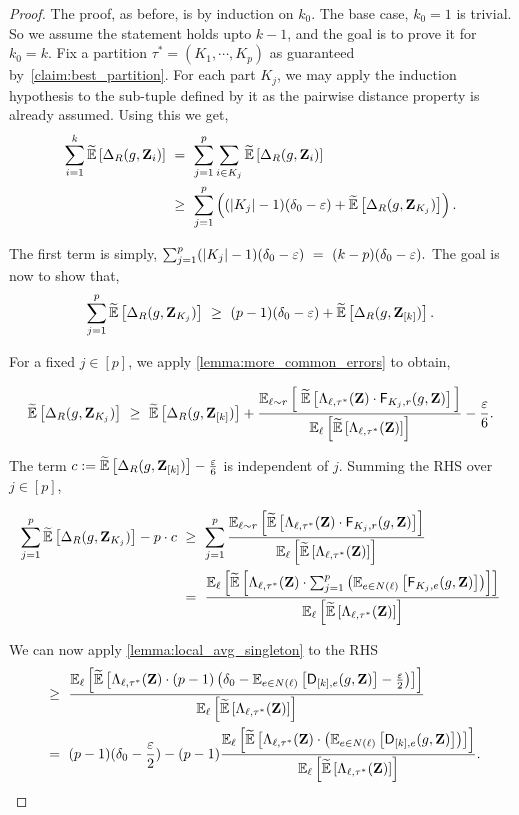 \begin{proof}
The proof, as before, is by induction on $k_0$. The base case, $k_0 =1$ is trivial. So we assume the statement holds upto $k-1$, and the goal is to prove it for $k_0=k$. Fix a partition $\tau^* = (K_1,\cdots, K_p)$ as guaranteed by~\cref{claim:best_partition}.  For each part $K_j$, we may apply the induction hypothesis to the sub-tuple defined by it as the pairwise distance property is already assumed. Using this we get, 
	\begin{align*}
\sum_{i=1}^k \tildeEx{\Delta_R(g,\zee_i)} 
		~&=~ \sum_{j=1}^p \sum_{i\in K_j} \tildeEx{\Delta_R(g,\zee_i)} \\
		~&\geq~ \sum_{j=1}^p \inparen{(|K_j|-1)(\delta_0 -\eps) + \tildeEx{\Delta_R(g,\zee_{K_j})}}.
		\end{align*}

The first term is simply,   
$
\sum_{j=1}^p (|K_j|-1)(\delta_0 -\varepsilon) ~=~ (k-p)(\delta_0 -\varepsilon) . 
$ The goal is now to show that, 
\[\sum_{j=1}^p\tildeEx{\Delta_R(g,\zee_{K_j})}	 ~\geq~ (p-1)(\delta_0 -\eps) + \tildeEx{\Delta_R(g,\zee_{[k]})}.\]
 
 For a fixed $j \in [p]$, we apply \cref{lemma:more_common_errors} to obtain, 

		\[
		\tildeEx{\Delta_R(g,\zee_{K_j})}	~\geq~  \tildeEx{\Delta_R(g,\zee_{[k]})}  + \frac{\Ex{\li \sim \ri}{\;\tildeEx{\Lambda_{\li,\tau^*}(\zee) \cdot \fd_{K_j,\ri}(g,\zee)}\,} }{\Ex{\li}{\tildeEx{\Lambda_{\li,\tau^*}(\zee)}}} - \frac{\eps}{6}.
		\]

The term $c := \tildeEx{\Delta_R(g,\zee_{[k]})}  - \frac{\eps}{6}$ is independent of $j$.
Summing the RHS over $j \in [p]$, 

\begin{align}
\sum_{j=1}^p	\tildeEx{\Delta_R(g,\zee_{K_j})} - p\cdot c ~&\geq~ \sum_{j=1}^p \frac{\Ex{\li \sim \ri}{\tildeEx{\Lambda_{\li,\tau^*}(\zee) \cdot \fd_{K_j,\ri}(g,\zee)}} }{\Ex{\li}{\tildeEx{\Lambda_{\li,\tau^*}(\zee)}}}\\
~&=~   { \frac{\Ex{\li}{\tildeEx{\Lambda_{\li,\tau^*}(\zee) \cdot \sum_{j=1}^p \inparen{\Ex{e\in N(\li)}{\fd_{K_j,e}(g,\zee)}} }}}{ \Ex{\li}{\tildeEx{\Lambda_{\li,\tau^*}(\zee)}} } }\label{eq:main}
		\end{align}

We can now apply \cref{lemma:local_avg_singleton} to the RHS
\begin{align}		
	~&\geq~ { \frac{\Ex{\li}{\tildeEx{\Lambda_{\li, \tau^*}(\zee) \cdot (p-1) \inparen{ \delta_0 - \Ex{e\in N(\li)}{\dd_{[k],e}(g,\zee)}  - \frac{\eps}{2}} }}}{\Ex{\li}{\tildeEx{\Lambda_{\li,\tau^*}(\zee)}}}} \\
	~&=~	(p-1)(\delta_0 - \frac{\eps}{2}) -(p-1) \frac{\Ex{\li}{\tildeEx{\Lambda_{\li, \tau^*}(\zee) \cdot \inparen{\Ex{e\in N(\li)}{\dd_{[k],e}(g,\zee)} } }}}{\Ex{\li}{\tildeEx{\Lambda_{\li,\tau^*}(\zee)}}}.\label{eq:second}
		 \end{align}


\end{proof}
